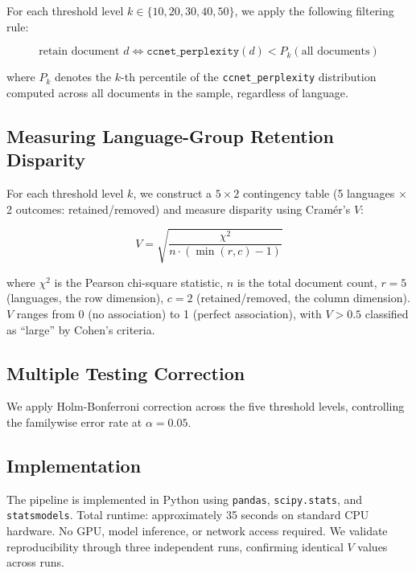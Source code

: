 For each threshold level $k \in \{10, 20, 30, 40, 50\}$, we apply the following filtering rule:

\begin{equation}
\text{retain document } d \iff \texttt{ccnet\_perplexity}(d) < P_k(\text{all documents})
\end{equation}

where $P_k$ denotes the $k$-th percentile of the \texttt{ccnet\_perplexity} distribution computed across all documents in the sample, regardless of language.

\subsection{Measuring Language-Group Retention Disparity}

For each threshold level $k$, we construct a $5 \times 2$ contingency table (5 languages $\times$ 2 outcomes: retained/removed) and measure disparity using Cram{\'e}r's $V$:

\begin{equation}
V = \sqrt{\frac{\chi^2}{n \cdot (\min(r, c) - 1)}}
\end{equation}

where $\chi^2$ is the Pearson chi-square statistic, $n$ is the total document count, $r = 5$ (languages, the row dimension), $c = 2$ (retained/removed, the column dimension). $V$ ranges from 0 (no association) to 1 (perfect association), with $V > 0.5$ classified as ``large'' by Cohen's criteria.

\subsection{Multiple Testing Correction}

We apply Holm-Bonferroni correction across the five threshold levels, controlling the familywise error rate at $\alpha = 0.05$.

\subsection{Implementation}

The pipeline is implemented in Python using \texttt{pandas}, \texttt{scipy.stats}, and \texttt{statsmodels}. Total runtime: approximately 35 seconds on standard CPU hardware. No GPU, model inference, or network access required. We validate reproducibility through three independent runs, confirming identical $V$ values across runs.
